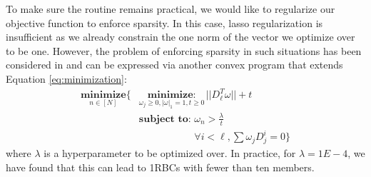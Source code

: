 \documentclass[aps,nofootinbib,pra,notitlepage,twocolumn]{revtex4-1}
\begin{document}
To make sure the routine remains practical, we would like to regularize our objective function to enforce sparsity. In this case, lasso regularization \cite{tibshirani1996regression} is insufficient as we already constrain the one norm of the vector we optimize over to be one. However, the problem of enforcing sparsity in such situations has been considered in \cite{NIPS2012_4504} and can be expressed via another convex program that extends Equation \ref{eq:minimization}:
\begin{equation}
\begin{split}
\underset{n\in[N]}{\textbf{minimize}}\{
    &\underset{\omega_j\geq0, |\omega|_1=1, t\geq0}{\textbf{minimize}: } ||D_{\ell}^T\omega|| + t\\
    &\textbf{subject to: } \omega_n > \frac{\lambda}{t}\\
    &\phantom{\textbf{subject to: }} \forall i<\ell, \sum \omega_jD_j^i=0\}
\end{split}
\end{equation} where $\lambda$ is a hyperparameter to be optimized over. In practice, for $\lambda=1E-4$, we have found that this can lead to 1RBCs with fewer than ten members.



\end{document}
